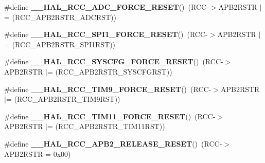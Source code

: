 \begin{DoxyCompactItemize}
\item 
\#define {\bfseries \+\_\+\+\_\+\+H\+A\+L\+\_\+\+R\+C\+C\+\_\+\+A\+D\+C\+\_\+\+F\+O\+R\+C\+E\+\_\+\+R\+E\+S\+ET}()~(R\+CC-\/$>$A\+P\+B2\+R\+S\+TR $\vert$= (R\+C\+C\+\_\+\+A\+P\+B2\+R\+S\+T\+R\+\_\+\+A\+D\+C\+R\+ST))\hypertarget{group___r_c_c___a_p_b2___force___release___reset_ga915c2f73eef5fc0e95d76219280ef6c0}{}\label{group___r_c_c___a_p_b2___force___release___reset_ga915c2f73eef5fc0e95d76219280ef6c0}

\item 
\#define {\bfseries \+\_\+\+\_\+\+H\+A\+L\+\_\+\+R\+C\+C\+\_\+\+S\+P\+I1\+\_\+\+F\+O\+R\+C\+E\+\_\+\+R\+E\+S\+ET}()~(R\+CC-\/$>$A\+P\+B2\+R\+S\+TR $\vert$= (R\+C\+C\+\_\+\+A\+P\+B2\+R\+S\+T\+R\+\_\+\+S\+P\+I1\+R\+ST))\hypertarget{group___r_c_c___a_p_b2___force___release___reset_ga87e6bc588fa1d5ce3928d2fd2a3156a4}{}\label{group___r_c_c___a_p_b2___force___release___reset_ga87e6bc588fa1d5ce3928d2fd2a3156a4}

\item 
\#define {\bfseries \+\_\+\+\_\+\+H\+A\+L\+\_\+\+R\+C\+C\+\_\+\+S\+Y\+S\+C\+F\+G\+\_\+\+F\+O\+R\+C\+E\+\_\+\+R\+E\+S\+ET}()~(R\+CC-\/$>$A\+P\+B2\+R\+S\+TR $\vert$= (R\+C\+C\+\_\+\+A\+P\+B2\+R\+S\+T\+R\+\_\+\+S\+Y\+S\+C\+F\+G\+R\+ST))\hypertarget{group___r_c_c___a_p_b2___force___release___reset_ga143ff27d8f59a39732efd79539e3765a}{}\label{group___r_c_c___a_p_b2___force___release___reset_ga143ff27d8f59a39732efd79539e3765a}

\item 
\#define {\bfseries \+\_\+\+\_\+\+H\+A\+L\+\_\+\+R\+C\+C\+\_\+\+T\+I\+M9\+\_\+\+F\+O\+R\+C\+E\+\_\+\+R\+E\+S\+ET}()~(R\+CC-\/$>$A\+P\+B2\+R\+S\+TR $\vert$= (R\+C\+C\+\_\+\+A\+P\+B2\+R\+S\+T\+R\+\_\+\+T\+I\+M9\+R\+ST))\hypertarget{group___r_c_c___a_p_b2___force___release___reset_ga9a62b264dec3df075dc7207993a9650e}{}\label{group___r_c_c___a_p_b2___force___release___reset_ga9a62b264dec3df075dc7207993a9650e}

\item 
\#define {\bfseries \+\_\+\+\_\+\+H\+A\+L\+\_\+\+R\+C\+C\+\_\+\+T\+I\+M11\+\_\+\+F\+O\+R\+C\+E\+\_\+\+R\+E\+S\+ET}()~(R\+CC-\/$>$A\+P\+B2\+R\+S\+TR $\vert$= (R\+C\+C\+\_\+\+A\+P\+B2\+R\+S\+T\+R\+\_\+\+T\+I\+M11\+R\+ST))\hypertarget{group___r_c_c___a_p_b2___force___release___reset_gaeaf6b459cfeb85e2e098b78825e476f2}{}\label{group___r_c_c___a_p_b2___force___release___reset_gaeaf6b459cfeb85e2e098b78825e476f2}

\item 
\#define {\bfseries \+\_\+\+\_\+\+H\+A\+L\+\_\+\+R\+C\+C\+\_\+\+A\+P\+B2\+\_\+\+R\+E\+L\+E\+A\+S\+E\+\_\+\+R\+E\+S\+ET}()~(R\+CC-\/$>$A\+P\+B2\+R\+S\+TR = 0x00)\hypertarget{group___r_c_c___a_p_b2___force___release___reset_gae1e413d623154942d5bbe89769161ece}{}\label{group___r_c_c___a_p_b2___force___release___reset_gae1e413d623154942d5bbe89769161ece}


\end{DoxyCompactItemize}
